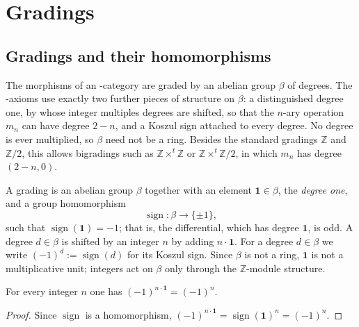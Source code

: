 
\chapter{Gradings}

\section{Gradings and their homomorphisms}

The morphisms of an \Ainf{}-category are graded by an abelian group $\beta$ of
degrees. The \Ainf{}-axioms use exactly two further pieces of structure on
$\beta$: a distinguished degree one, by whose integer multiples degrees are
shifted, so that the $n$-ary operation $m_n$ can have degree $2-n$, and a Koszul
sign attached to every degree. No degree is ever
multiplied, so $\beta$ need not be a ring. Besides the standard gradings
$\mathbb{Z}$ and $\mathbb{Z}/2$, this allows bigradings such as
$\mathbb{Z}\times^t\mathbb{Z}$ or $\mathbb{Z}\times^t\mathbb{Z}/2$, in which $m_n$
has degree $(2-n,0)$.

\begin{definition}[Grading]
\label{AInfinityTheory.Grading}
\leanok
A grading is an abelian group $\beta$ together with an element
$\mathbf{1} \in \beta$, the \emph{degree one}, and a group homomorphism
\[
  \operatorname{sign} : \beta \to \{\pm 1\},
\]
such that $\operatorname{sign}(\mathbf{1}) = -1$; that is, the differential,
which has degree $\mathbf{1}$, is odd. A degree $d \in \beta$ is shifted by an
integer $n$ by adding $n \cdot \mathbf{1}$. For a degree $d \in \beta$ we write
$(-1)^d := \operatorname{sign}(d)$ for its Koszul sign. Since $\beta$ is not a
ring, $\mathbf{1}$ is not a multiplicative unit; integers act on $\beta$ only
through the $\mathbb{Z}$-module structure.
\end{definition}

\begin{lemma}
\label{AInfinityTheory.sign_zsmul_degOne}
\leanok
{}
For every integer $n$ one has $(-1)^{n \cdot \mathbf{1}} = (-1)^n$.
\end{lemma}
\begin{proof}
\leanok
Since $\operatorname{sign}$ is a homomorphism,
$(-1)^{n \cdot \mathbf{1}} = \operatorname{sign}(\mathbf{1})^n = (-1)^n$.
\end{proof}

